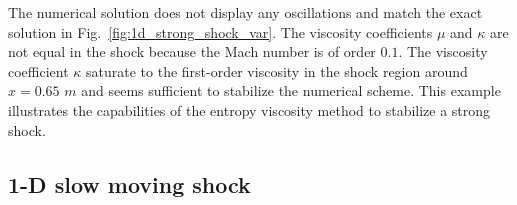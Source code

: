\documentclass[preprint,10pt]{elsarticle}
\newcommand{\fig}[1]{Fig.~\ref{#1}}                      %
\begin{document}
%
The numerical solution does not display any oscillations and match the exact solution in \fig{fig:1d_strong_shock_var}. The viscosity coefficients $\mu$ and $\kappa$ are not equal in the shock because the Mach number is of order $0.1$. The viscosity coefficient $\kappa$ saturate to the first-order viscosity in the shock region around $x = 0.65$ $m$ and seems sufficient to stabilize the numerical scheme. This example illustrates the capabilities of the entropy viscosity method to stabilize a strong shock. 

\subsection{1-D slow moving shock} \label{sec:slow_moving_shock}
\end{document}
